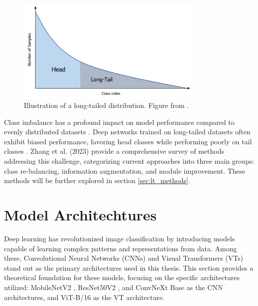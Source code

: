 \begin{figure}[ht]
    \centering
    \includegraphics[width=0.8\textwidth]{Images/long_tail_distribution.png} 
    \caption{Illustration of a long-tailed distribution. Figure from \cite{lgresearch257}.}
    \label{fig:lt_distribution} %
\end{figure}

Class imbalance has a profound impact on model performance compared to evenly distributed datasets \cite{vanhorn2017deviltailsfinegrainedclassification, cui2019classbalancedlossbasedeffective}. Deep networks trained on long-tailed datasets often exhibit biased performance, favoring head classes while performing poorly on tail classes \cite{zhang2023deep}. Zhang et al. (2023) provide a comprehensive survey of methods addressing this challenge, categorizing current approaches into three main groups: class re-balancing, information augmentation, and module improvement. These methods will be further explored in section \ref{sec:lt_methods}. 



\section{Model Architechtures}
Deep learning has revolutionized image classification by introducing models capable of learning complex patterns and representations from data. Among these, Convolutional Neural Networks (CNNs) and Visual Transformers (VTs) stand out as the primary architectures used in this thesis. This section provides a theoretical foundation for these models, focusing on the specific architectures utilized: MobileNetV2 \cite{sandler2018mobilenetv2}, ResNet50V2 \cite{he2016}, and ConvNeXt Base \cite{todi2023convnext} as the CNN architectures, and ViT-B/16 \cite{dosovitskiy2021imageworth16x16words} as the VT architecture.


